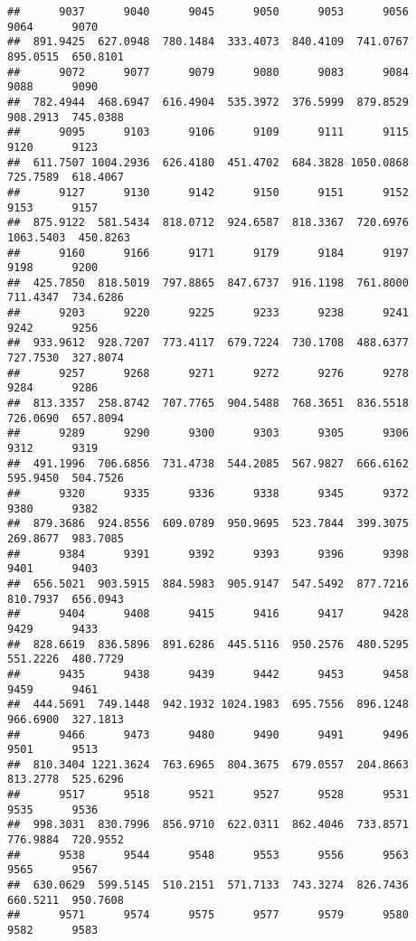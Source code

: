 \documentclass[
]{article}
\begin{document}
\begin{verbatim}
##      9037      9040      9045      9050      9053      9056      9064      9070 
##  891.9425  627.0948  780.1484  333.4073  840.4109  741.0767  895.0515  650.8101 
##      9072      9077      9079      9080      9083      9084      9088      9090 
##  782.4944  468.6947  616.4904  535.3972  376.5999  879.8529  908.2913  745.0388 
##      9095      9103      9106      9109      9111      9115      9120      9123 
##  611.7507 1004.2936  626.4180  451.4702  684.3828 1050.0868  725.7589  618.4067 
##      9127      9130      9142      9150      9151      9152      9153      9157 
##  875.9122  581.5434  818.0712  924.6587  818.3367  720.6976 1063.5403  450.8263 
##      9160      9166      9171      9179      9184      9197      9198      9200 
##  425.7850  818.5019  797.8865  847.6737  916.1198  761.8000  711.4347  734.6286 
##      9203      9220      9225      9233      9238      9241      9242      9256 
##  933.9612  928.7207  773.4117  679.7224  730.1708  488.6377  727.7530  327.8074 
##      9257      9268      9271      9272      9276      9278      9284      9286 
##  813.3357  258.8742  707.7765  904.5488  768.3651  836.5518  726.0690  657.8094 
##      9289      9290      9300      9303      9305      9306      9312      9319 
##  491.1996  706.6856  731.4738  544.2085  567.9827  666.6162  595.9450  504.7526 
##      9320      9335      9336      9338      9345      9372      9380      9382 
##  879.3686  924.8556  609.0789  950.9695  523.7844  399.3075  269.8677  983.7085 
##      9384      9391      9392      9393      9396      9398      9401      9403 
##  656.5021  903.5915  884.5983  905.9147  547.5492  877.7216  810.7937  656.0943 
##      9404      9408      9415      9416      9417      9428      9429      9433 
##  828.6619  836.5896  891.6286  445.5116  950.2576  480.5295  551.2226  480.7729 
##      9435      9438      9439      9442      9453      9458      9459      9461 
##  444.5691  749.1448  942.1932 1024.1983  695.7556  896.1248  966.6900  327.1813 
##      9466      9473      9480      9490      9491      9496      9501      9513 
##  810.3404 1221.3624  763.6965  804.3675  679.0557  204.8663  813.2778  525.6296 
##      9517      9518      9521      9527      9528      9531      9535      9536 
##  998.3031  830.7996  856.9710  622.0311  862.4046  733.8571  776.9884  720.9552 
##      9538      9544      9548      9553      9556      9563      9565      9567 
##  630.0629  599.5145  510.2151  571.7133  743.3274  826.7436  660.5211  950.7608 
##      9571      9574      9575      9577      9579      9580      9582      9583 

\end{verbatim}
\end{document}
